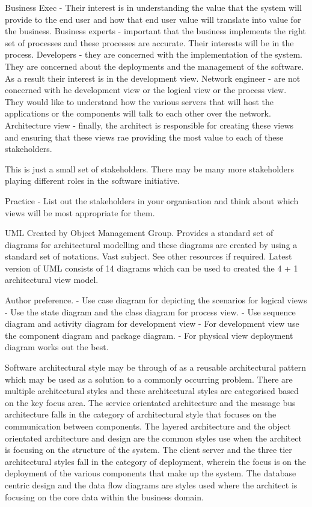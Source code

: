 \documentclass[a4paper, 11pt]{book}
\begin{document}
    Business Exec - Their interest is in understanding the value that the system will provide to the end user and how that end user value will translate into value for the business.
    Business experts - important that the business implements the right set of processes and these processes are accurate. Their interests will be in the process.
    Developers - they are concerned with the implementation of the system.
    They are concerned about the deployments and the management of the software.
    As a result their interest is in the development view.
    Network engineer - are not concerned with he development view or the logical view or the process view.
    They would like to understand how the various servers that will host the applications or the components will talk to each other over the network.
    Architecture view - finally, the architect is responsible for creating these views and ensuring that these views rae providing the most value to each of these stakeholders.

    This is just a small set of stakeholders.
    There may be many more stakeholders playing different roles in the software initiative.

    Practice
    - List out the stakeholders in your organisation and think about which views will be most appropriate for them.


    UML
    Created by Object Management Group.
    Provides a standard set of diagrams for architectural modelling and these diagrams are created by using a standard set of notations.
    Vast subject.
    See other resources if required.
    Latest version of UML consists of 14 diagrams which can be used to created the 4 + 1 architectural view model.

    Author preference.
    - Use case diagram for depicting the scenarios for logical views
    - Use the state diagram and the class diagram for process view.
    - Use sequence diagram and activity diagram for development view
    - For development view use the component diagram and package diagram.
    - For physical view deployment diagram works out the best.

    Software architectural style may be through of as a reusable architectural pattern which may be used as a solution to a commonly occurring problem.
    There are multiple architectural styles and these architectural styles are categorised based on the key focus area.
    The service orientated architecture and the message bus architecture falls in the category of architectural style that focuses on the communication between components.
    The layered architecture and the object orientated architecture and design are the common styles use when the architect is focusing on the structure of the system.
    The client server and the three tier architectural styles fall in the category of deployment, wherein the focus is on the deployment of the various components that make up the system.
    The database centric design and the data flow diagrams are styles used where the architect is focusing on the core data within the business domain.
\end{document}
